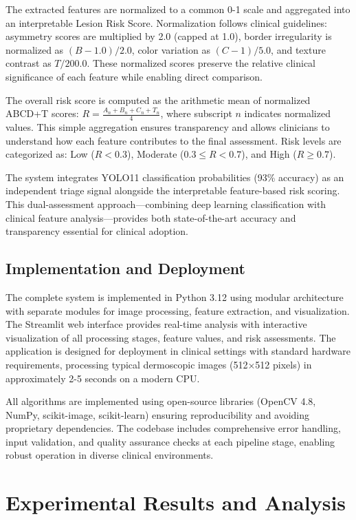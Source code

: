 \documentclass[conference]{IEEEtran}
\begin{document}
The extracted features are normalized to a common 0-1 scale and aggregated into an interpretable Lesion Risk Score. Normalization follows clinical guidelines: asymmetry scores are multiplied by 2.0 (capped at 1.0), border irregularity is normalized as $(B - 1.0)/2.0$, color variation as $(C - 1)/5.0$, and texture contrast as $T/200.0$. These normalized scores preserve the relative clinical significance of each feature while enabling direct comparison.

The overall risk score is computed as the arithmetic mean of normalized ABCD+T scores: $R = \frac{A_n + B_n + C_n + T_n}{4}$, where subscript $n$ indicates normalized values. This simple aggregation ensures transparency and allows clinicians to understand how each feature contributes to the final assessment. Risk levels are categorized as: Low ($R < 0.3$), Moderate ($0.3 \leq R < 0.7$), and High ($R \geq 0.7$).

The system integrates YOLO11 classification probabilities (93\% accuracy) as an independent triage signal alongside the interpretable feature-based risk scoring. This dual-assessment approach—combining deep learning classification with clinical feature analysis—provides both state-of-the-art accuracy and transparency essential for clinical adoption.

\subsection{Implementation and Deployment}

The complete system is implemented in Python 3.12 using modular architecture with separate modules for image processing, feature extraction, and visualization. The Streamlit web interface provides real-time analysis with interactive visualization of all processing stages, feature values, and risk assessments. The application is designed for deployment in clinical settings with standard hardware requirements, processing typical dermoscopic images (512×512 pixels) in approximately 2-5 seconds on a modern CPU.

All algorithms are implemented using open-source libraries (OpenCV 4.8, NumPy, scikit-image, scikit-learn) ensuring reproducibility and avoiding proprietary dependencies. The codebase includes comprehensive error handling, input validation, and quality assurance checks at each pipeline stage, enabling robust operation in diverse clinical environments.

\section{Experimental Results and Analysis}
\end{document}

